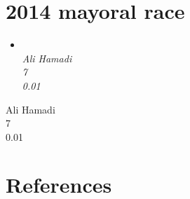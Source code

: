 \section{2014 mayoral race}\label{mayoral-race}

\begin{itemize}
\item
  \emph{\\
  Ali Hamadi\\
  7\\
  0.01}
\end{itemize}

Ali Hamadi\\
7\\
0.01

\section{References}\label{references}
